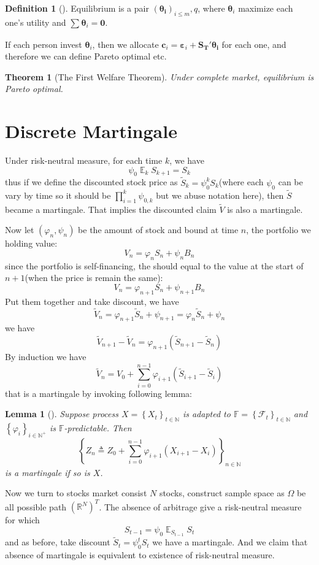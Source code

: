 \documentclass[
  12pt,
  oneside]{book}
\newcommand{\bm}[1]{\symbf{#1}}
\newtheorem{theorem}{Theorem}[chapter]
\newtheorem{lemma}{Lemma}[chapter]
\theoremstyle{definition}
\newtheorem{definition}{Definition}[chapter]
\theoremstyle{definition}
\theoremstyle{definition}
\theoremstyle{definition}
\theoremstyle{remark}
\begin{document}
\begin{definition}[]
Equilibrium is a pair \((\bm{\theta_{i}})_{i\le m},q\), where \(\bm{\theta}_{i}\) maximize each one's utility and \(\sum_{}^{}\bm{\theta}_{i}=\bm{0}\).
\end{definition}

If each person invest \(\bm{\theta}_{i}\), then we allocate \(\bm{c}_{i}=\bm{\varepsilon}_{i}+\bm{S_{T}'\theta_{i}}\) for each one, and therefore we can define Pareto optimal etc.

\begin{theorem}[The First Welfare Theorem]
Under complete market, equilibrium is Pareto optimal.
\end{theorem}

\hypertarget{discrete-martingale}{%
\section{Discrete Martingale}\label{discrete-martingale}}

Under risk-neutral measure, for each time \(k\), we have
\[
\psi_{0}\mathop{{}\mathbb{E}}_{k}{S}_{k+1}=S_{k}
\]
thus if we define the discounted stock price as \(\widetilde{S}_{k}=\psi_0^{k} S_{k}\)(where each \(\psi_0\) can be vary by time so it should be \(\prod_{i=1} ^{k} \psi_{0,k}\) but we abuse notation here), then \(\widetilde{S}\) became a martingale. That implies the discounted claim \(\widetilde{V}\) is also a martingale.

Now let \((\varphi_n,\psi_n)\) be the amount of stock and bound at time \(n\), the portfolio we holding value:
\[
V_n=\varphi_{n}S_n+\psi_{n}B_n
\]
since the portfolio is self-financing, the should equal to the value at the start of \(n+1\)(when the price is remain the same):
\[
V_n=\varphi_{n+1}S_n+\psi_{n+1}B_n
\]
Put them together and take discount, we have
\[
\widetilde{V}_n=\varphi_{n+1}\widetilde{S}_{n}+\psi_{n+1}=\varphi_{n}\widetilde{S}_{n}+\psi_{n}
\]
we have
\[
\widetilde{V}_{n+1}-\widetilde{V}_n=\varphi_{n+1}(\widetilde{S}_{n+1}-\widetilde{S}_n)
\]
By induction we have
\[
\widetilde{V}_n=V_0+\sum_{i=0}^{n-1}\varphi_{i+1}(\widetilde{S}_{i+1}-\widetilde{S}_{i})
\]
that is a martingale by invoking following lemma:

\begin{lemma}[]
Suppose process \(X=\left\{ X_{t} \right\}_{t\in \mathbb{N}}\) is adapted to \(\mathbb{F}=\left\{ \mathcal{F}_t \right\}_{t \in \mathbb{N}}\) and \(\left\{ \varphi_i \right\}_{i \in \mathbb{N^{+}}}\) is \(\mathbb{F}\)-predictable. Then
\[
\left\{ Z_n\triangleq Z_0+\sum_{i=0}^{n-1}\varphi_{i+1}(X_{i+1}-X_i) \right\}_{n \in \mathbb{N}}
\]
is a martingale if so is \(X\).
\end{lemma}

Now we turn to stocks market consist \(N\) stocks, construct sample space as \(\Omega\) be all possible path \((\mathbb{R}^{N})^{T}\). The absence of arbitrage give a risk-neutral measure for which
\[
S_{t-1}=\psi_{0}\mathop{{}\mathbb{E}}_{S_{t-1}}S_{t}
\]
and as before, take discount \(\widetilde{S}_{t}=\psi_{0}^{t}S_{t}\) we have a martingale. And we claim that absence of martingale is equivalent to existence of risk-neutral measure.

  
\end{document}
